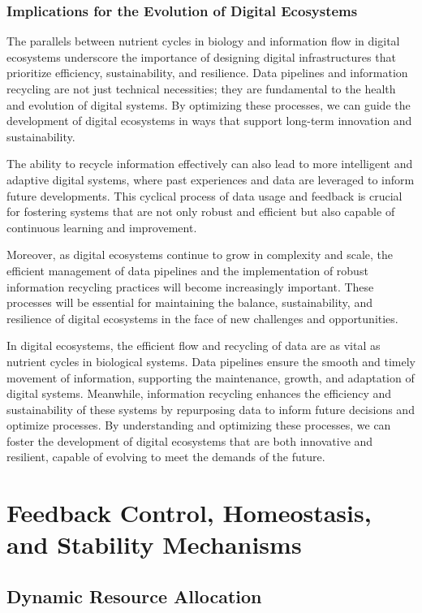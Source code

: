 \documentclass[12pt,twoside]{article}
\begin{document}
\subsubsection{Implications for the Evolution of Digital Ecosystems}

The parallels between nutrient cycles in biology and information flow in digital ecosystems underscore the importance of designing digital infrastructures that prioritize efficiency, sustainability, and resilience. Data pipelines and information recycling are not just technical necessities; they are fundamental to the health and evolution of digital systems. By optimizing these processes, we can guide the development of digital ecosystems in ways that support long-term innovation and sustainability.

The ability to recycle information effectively can also lead to more intelligent and adaptive digital systems, where past experiences and data are leveraged to inform future developments. This cyclical process of data usage and feedback is crucial for fostering systems that are not only robust and efficient but also capable of continuous learning and improvement.

Moreover, as digital ecosystems continue to grow in complexity and scale, the efficient management of data pipelines and the implementation of robust information recycling practices will become increasingly important. These processes will be essential for maintaining the balance, sustainability, and resilience of digital ecosystems in the face of new challenges and opportunities.

In digital ecosystems, the efficient flow and recycling of data are as vital as nutrient cycles in biological systems. Data pipelines ensure the smooth and timely movement of information, supporting the maintenance, growth, and adaptation of digital systems. Meanwhile, information recycling enhances the efficiency and sustainability of these systems by repurposing data to inform future decisions and optimize processes. By understanding and optimizing these processes, we can foster the development of digital ecosystems that are both innovative and resilient, capable of evolving to meet the demands of the future.

\section{Feedback Control, Homeostasis, and Stability Mechanisms}

\subsection{Dynamic Resource Allocation}
\end{document}
